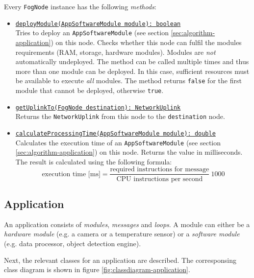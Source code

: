 \begin{itemize}
    Every \texttt{FogNode} instance has the following \textit{methods}:
    \begin{itemize}
        \item \underline{\texttt{deployModule(AppSoftwareModule module): boolean}}\\ [0.5ex] 
        Tries to deploy an \texttt{AppSoftwareModule} (see section \ref{sec:algorithm-application}) on this node. Checks whether this node can fulfil the modules requirements (RAM, storage, hardware modules). Modules are \textit{not} automatically undeployed. The method can be called multiple times and thus more than one module can be deployed. In this case, sufficient resources must be available to execute \textit{all} modules. The method returns \texttt{false} for the first module that cannot be deployed, otherwise \texttt{true}.
        
        \item \underline{\texttt{getUplinkTo(FogNode destination): NetworkUplink}}\\ [0.5ex] 
        Returns the \texttt{NetworkUplink} from this node to the \texttt{destination} node.
        
        \item \underline{\texttt{calculateProcessingTime(AppSoftwareModule module): double}}\\ [0.5ex] 
        Calculates the execution time of an \texttt{AppSoftwareModule} (see section \ref{sec:algorithm-application}) on this node. Returns the value in milliseconds. The result is calculated using the following formula:
        \[\textrm{execution time [ms]} = \frac{\textrm{required instructions for message}}{\textrm{CPU instructions per second}}\ 1000\]
    \end{itemize}

\end{itemize}


\subsection{Application\label{sec:algorithm-application}}

An application consists of \textit{modules}, \textit{messages} and \textit{loops}. A module can either be a \textit{hardware module} (e.g. a camera or a temperature sensor) or a \textit{software module} (e.g. data processor, object detection engine).

Next, the relevant classes for an application are described. The corresponsing class diagram is shown in figure \ref{fig:classdiagram-application}.


